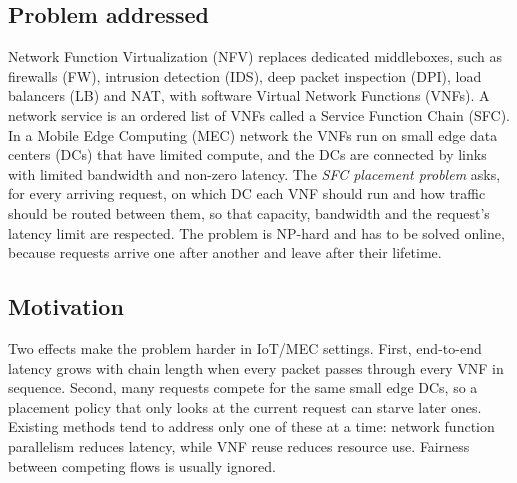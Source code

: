 \documentclass[11pt,a4paper]{article}
\begin{document}
\subsection{Problem addressed}
Network Function Virtualization (NFV) replaces dedicated middleboxes, such as
firewalls (FW), intrusion detection (IDS), deep packet inspection (DPI), load
balancers (LB) and NAT, with software Virtual Network Functions (VNFs). A
network service is an ordered list of VNFs called a Service Function Chain
(SFC). In a Mobile Edge Computing (MEC) network the VNFs run on small edge data
centers (DCs) that have limited compute, and the DCs are connected by links with
limited bandwidth and non-zero latency. The \emph{SFC placement problem} asks,
for every arriving request, on which DC each VNF should run and how traffic
should be routed between them, so that capacity, bandwidth and the request's
latency limit are respected. The problem is NP-hard and has to be solved online,
because requests arrive one after another and leave after their lifetime.

\subsection{Motivation}
Two effects make the problem harder in IoT/MEC settings. First, end-to-end
latency grows with chain length when every packet passes through every VNF in
sequence. Second, many requests compete for the same small edge DCs, so a
placement policy that only looks at the current request can starve later ones.
Existing methods tend to address only one of these at a time: network function
parallelism reduces latency, while VNF reuse reduces resource use. Fairness
between competing flows is usually ignored.
\end{document}
